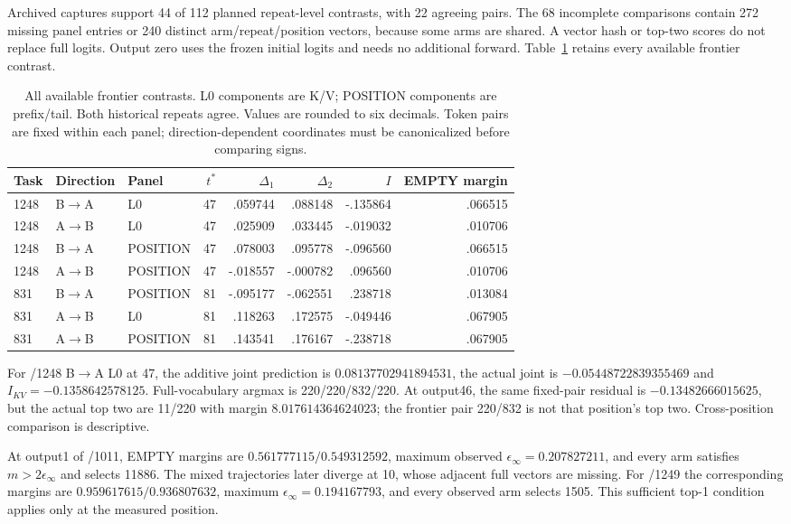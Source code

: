 Archived captures support 44 of 112 planned repeat-level contrasts, with 22 agreeing pairs. The 68 incomplete comparisons contain 272 missing panel entries or 240 distinct arm/repeat/position vectors, because some arms are shared. A vector hash or top-two scores do not replace full logits. Output zero uses the frozen initial logits and needs no additional forward. Table~\ref{tab:frontier} retains every available frontier contrast.
\begin{table}[t]\centering\small
\caption{All available frontier contrasts. L0 components are K/V; POSITION components are prefix/tail. Both historical repeats agree. Values are rounded to six decimals. Token pairs are fixed within each panel; direction-dependent coordinates must be canonicalized before comparing signs.}
\label{tab:frontier}
\begin{tabular}{@{}lllr rrrr@{}}\toprule
Task&Direction&Panel&$t^*$&$\Delta_1$&$\Delta_2$&$I$&EMPTY margin\\\midrule
1248&B$\to$A&L0&47& .059744& .088148&-.135864&.066515\\
1248&A$\to$B&L0&47& .025909& .033445&-.019032&.010706\\
1248&B$\to$A&POSITION&47& .078003& .095778&-.096560&.066515\\
1248&A$\to$B&POSITION&47&-.018557&-.000782& .096560&.010706\\
831&B$\to$A&POSITION&81&-.095177&-.062551& .238718&.013084\\
831&A$\to$B&L0&81& .118263& .172575&-.049446&.067905\\
831&A$\to$B&POSITION&81& .143541& .176167&-.238718&.067905\\\bottomrule
\end{tabular}
\end{table}
For /1248 B$\to$A L0 at 47, the additive joint prediction is $0.08137702941894531$, the actual joint is $-0.05448722839355469$ and $I_{KV}=-0.1358642578125$. Full-vocabulary argmax is 220/220/832/220. At output46, the same fixed-pair residual is $-0.13482666015625$, but the actual top two are 11/220 with margin $8.017614364624023$; the frontier pair 220/832 is not that position's top two. Cross-position comparison is descriptive.

At output1 of /1011, EMPTY margins are $0.561777115/0.549312592$, maximum observed $\epsilon_\infty=0.207827211$, and every arm satisfies $m>2\epsilon_\infty$ and selects 11886. The mixed trajectories later diverge at 10, whose adjacent full vectors are missing. For /1249 the corresponding margins are $0.959617615/0.936807632$, maximum $\epsilon_\infty=0.194167793$, and every observed arm selects 1505. This sufficient top-1 condition applies only at the measured position.

